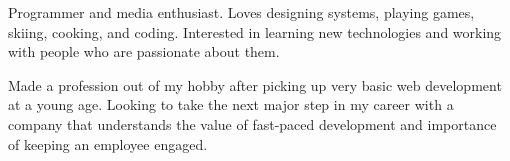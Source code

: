 

\begin{cvparagraph}

Programmer and media enthusiast. Loves designing systems, playing games, skiing, cooking, and coding. Interested in learning new technologies and working with people who are passionate about them.

Made a profession out of my hobby after picking up very basic web development at a young age.
Looking to take the next major step in my career with a company that understands the value of fast-paced development and importance of keeping an employee engaged.
\end{cvparagraph}
